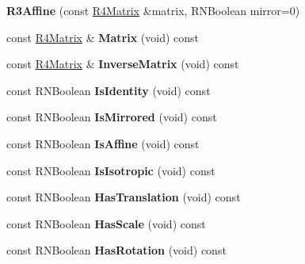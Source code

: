 \begin{DoxyCompactItemize}
\item 
{\bfseries R3\+Affine} (const \hyperlink{class_r4_matrix}{R4\+Matrix} \&matrix, R\+N\+Boolean mirror=0)\hypertarget{class_r3_affine_a9ac526b0ec685cc87b1c8830ad70fb95}{}\label{class_r3_affine_a9ac526b0ec685cc87b1c8830ad70fb95}

\item 
const \hyperlink{class_r4_matrix}{R4\+Matrix} \& {\bfseries Matrix} (void) const \hypertarget{class_r3_affine_a4b378314112cd75774f172d5eafb90a2}{}\label{class_r3_affine_a4b378314112cd75774f172d5eafb90a2}

\item 
const \hyperlink{class_r4_matrix}{R4\+Matrix} \& {\bfseries Inverse\+Matrix} (void) const \hypertarget{class_r3_affine_a3bddcfc3ee4ca90ef33e831734db62ba}{}\label{class_r3_affine_a3bddcfc3ee4ca90ef33e831734db62ba}

\item 
const R\+N\+Boolean {\bfseries Is\+Identity} (void) const \hypertarget{class_r3_affine_a81b8c40d5d3b6a93329f793b76db6859}{}\label{class_r3_affine_a81b8c40d5d3b6a93329f793b76db6859}

\item 
const R\+N\+Boolean {\bfseries Is\+Mirrored} (void) const \hypertarget{class_r3_affine_a6c0afaeb7c4b23c78262d0c89333d65b}{}\label{class_r3_affine_a6c0afaeb7c4b23c78262d0c89333d65b}

\item 
const R\+N\+Boolean {\bfseries Is\+Affine} (void) const \hypertarget{class_r3_affine_acc96270e8d5d18b6df01465327f532f1}{}\label{class_r3_affine_acc96270e8d5d18b6df01465327f532f1}

\item 
const R\+N\+Boolean {\bfseries Is\+Isotropic} (void) const \hypertarget{class_r3_affine_a2d12662c6cb51b86a0617341405fead9}{}\label{class_r3_affine_a2d12662c6cb51b86a0617341405fead9}

\item 
const R\+N\+Boolean {\bfseries Has\+Translation} (void) const \hypertarget{class_r3_affine_a6d27c40cb353173059873a6b23db5b6a}{}\label{class_r3_affine_a6d27c40cb353173059873a6b23db5b6a}

\item 
const R\+N\+Boolean {\bfseries Has\+Scale} (void) const \hypertarget{class_r3_affine_a268202be11d7d142421c20afe71f4986}{}\label{class_r3_affine_a268202be11d7d142421c20afe71f4986}

\item 
const R\+N\+Boolean {\bfseries Has\+Rotation} (void) const \hypertarget{class_r3_affine_a74506b838d04073affcdb4f2c3f5c544}{}\label{class_r3_affine_a74506b838d04073affcdb4f2c3f5c544}


\end{DoxyCompactItemize}
